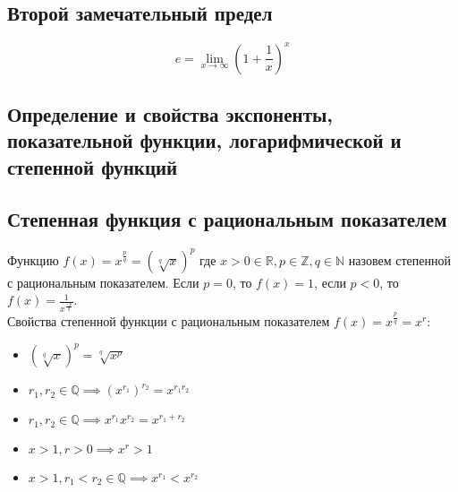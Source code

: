 \documentclass{article}
\begin{document}
        
    \newpage
    
    \section{}
    \subsection{Второй замечательный предел}
        \[ e = \lim_{x \to \infty} {\left( 1 + \frac{1}{x} \right)}^x \]


    \subsection{Определение и свойства экспоненты, показательной функции, логарифмической и степенной функций}
        \subsection*{Степенная функция с рациональным показателем}
        Функцию $f(x) = x^{\frac{p}{q}} = \left( \sqrt[q]{x} \right)^p $ где $x > 0 \in \mathbb{R}, p \in \mathbb{Z}, q \in \mathbb{N}$ назовем степенной с рациональным показателем.
        Если $p = 0$, то $f(x) = 1$, если $p < 0$, то $f(x) = \frac{1}{x^{\frac{-p}{q}}}$.
        \\
        Свойства степенной функции с рациональным показателем $f(x) = x^{\frac{p}{q}} = x^r$:
        \begin{itemize}
            \item $ \left( \sqrt[q]{x} \right)^p = \sqrt[q]{x^p} $
            \item $ r_1, r_2 \in \mathbb{Q} \implies {\left( x^{r_1} \right)}^{r_2} = x^{r_1r_2} $
            \item $ r_1, r_2 \in \mathbb{Q} \implies x^{r_1}x^{r_2} = x^{r_1 + r_2} $
            \item $ x > 1, r > 0 \implies x^r > 1 $
            \item $ x > 1, r_1 < r_2 \in \mathbb{Q} \implies x^{r_1} < x^{r_2}$
        \end{itemize}
        
\end{document}
